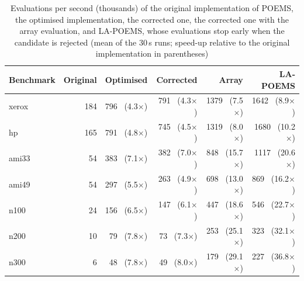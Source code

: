 \begin{table}
\centering
\small
\begin{tabular}{@{}lrrrrr@{}}
\toprule
Benchmark & Original & Optimised & Corrected & Array & LA-POEMS \\
\midrule
xerox & 184 & 796 \ (4.3$\times$) & 791 \ (4.3$\times$) & 1379 \ (7.5$\times$) & 1642 \ (8.9$\times$) \\
hp & 165 & 791 \ (4.8$\times$) & 745 \ (4.5$\times$) & 1319 \ (8.0$\times$) & 1680 \ (10.2$\times$) \\
ami33 & 54 & 383 \ (7.1$\times$) & 382 \ (7.0$\times$) & 848 \ (15.7$\times$) & 1117 \ (20.6$\times$) \\
ami49 & 54 & 297 \ (5.5$\times$) & 263 \ (4.9$\times$) & 698 \ (13.0$\times$) & 869 \ (16.2$\times$) \\
n100 & 24 & 156 \ (6.5$\times$) & 147 \ (6.1$\times$) & 447 \ (18.6$\times$) & 546 \ (22.7$\times$) \\
n200 & 10 & 79 \ (7.8$\times$) & 73 \ (7.3$\times$) & 253 \ (25.1$\times$) & 323 \ (32.1$\times$) \\
n300 & 6 & 48 \ (7.8$\times$) & 49 \ (8.0$\times$) & 179 \ (29.1$\times$) & 227 \ (36.8$\times$) \\
\bottomrule
\end{tabular}
\caption{Evaluations per second (thousands) of the original implementation of POEMS, the optimised implementation, the corrected one, the corrected one with the array evaluation, and LA-POEMS, whose evaluations stop early when the candidate is rejected (mean of the 30\,s runs; speed-up relative to the original implementation in parentheses)}
\label{tab:speed}
\end{table}

